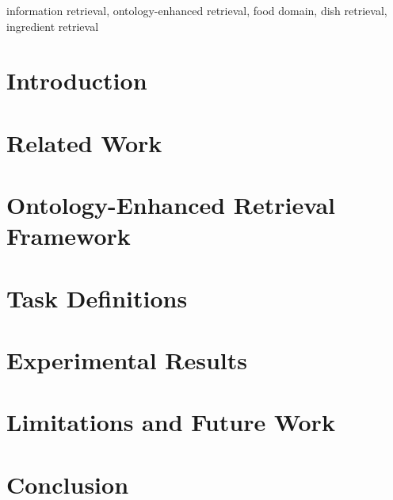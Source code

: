 \documentclass[conference]{IEEEtran}
\begin{document}
\begin{IEEEkeywords}
information retrieval, ontology-enhanced retrieval, food domain, dish retrieval, ingredient retrieval
\end{IEEEkeywords}

\section{Introduction}


\section{Related Work}


\section{Ontology-Enhanced Retrieval Framework}


\section{Task Definitions}


\section{Experimental Results}


\section{Limitations and Future Work}


\section{Conclusion}




\end{document}
